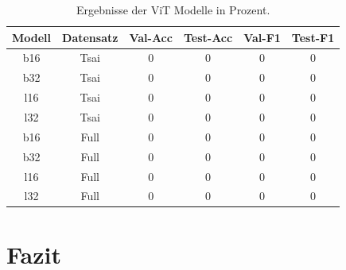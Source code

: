 \documentclass[twoside,a4paper]{IEEEtran}
\begin{document}
\begin{table}[!htb]
	\caption{Ergebnisse der ViT Modelle in Prozent.}
	\label{vit_ergebnis}
	\centering
	\begin{tabular}{|c|c|c|c|c|c|}
		\hline
		Modell & Datensatz & Val-Acc & Test-Acc & Val-F1 & Test-F1\\
		\hline
		\hline
		b16 & Tsai & 0 & 0 & 0 & 0\\
		\hline
		b32 & Tsai & 0 & 0 & 0 & 0\\
		\hline
		l16 & Tsai & 0 & 0 & 0 & 0\\
		\hline
		l32 & Tsai & 0 & 0 & 0 & 0\\
		\hline 
		\hline 
		b16 & Full & 0 & 0 & 0 & 0\\
		\hline
		b32 & Full & 0 & 0 & 0 & 0\\
		\hline
		l16 & Full & 0 & 0 & 0 & 0\\
		\hline
		l32 & Full & 0 & 0 & 0 & 0\\
		\hline 
	\end{tabular}
\end{table}
\section{Fazit} %




%
%
\end{document}
